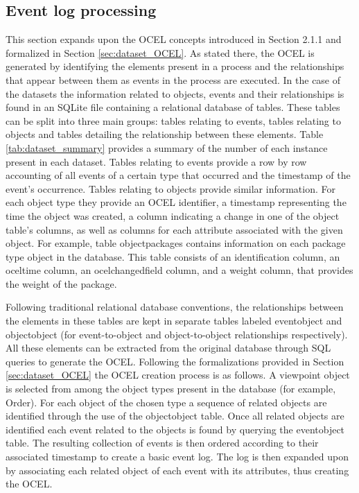	\subsection{Event log processing}
    \label{sec:dataset_data_processing}

	This section expands upon the OCEL concepts introduced in Section 2.1.1 and formalized in Section \ref{sec:dataset_OCEL}. As stated there, the OCEL is generated by identifying the elements present in a process and the relationships that appear between them as events in the process are executed. In the case of the datasets the information related to objects, events and their relationships is found in an SQLite file containing a relational database of tables. These tables can be split into three main groups: tables relating to events, tables relating to objects and tables detailing the relationship between these elements. Table \ref{tab:dataset_summary} provides a summary of the number of each instance present in each dataset. Tables relating to events provide a row by row accounting of all events of a certain type that occurred and the timestamp of the event's occurrence. Tables relating to objects provide similar information. For each object type they provide an OCEL identifier, a timestamp representing the time the object was created, a column indicating a change in one of the object table's columns, as well as columns for each attribute associated with the given object. For example, table object\textunderscore packages contains information on each package type object in the database. This table consists of an identification column, an ocel\textunderscore time column, an ocel\textunderscore changed\textunderscore field column, and a weight column, that provides the weight of the package.
    
    Following traditional relational database conventions, the relationships between the elements in these tables are kept in separate tables labeled event\textunderscore object and object\textunderscore object (for event-to-object and object-to-object relationships respectively). 
    All these elements can be extracted from the original database through SQL queries to generate the OCEL. Following the formalizations provided in Section \ref{sec:dataset_OCEL} the OCEL creation process is as follows.
    A viewpoint object is selected from among the object types present in the database (for example, Order). For each object of the chosen type a sequence of related objects are identified through the use of the object\textunderscore object table. Once all related objects are identified each event related to the objects is found by querying the event\textunderscore object table. The resulting collection of events is then ordered according to their associated timestamp to create a basic event log. The log is then expanded upon by associating each related object of each event with its attributes, thus creating the OCEL.

